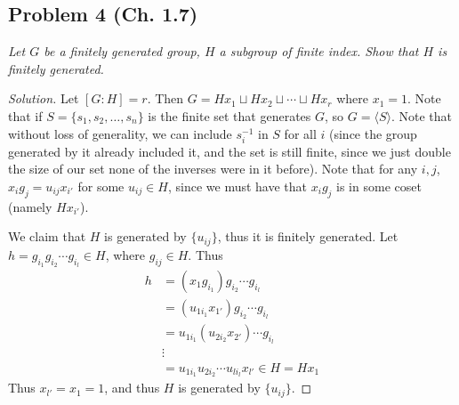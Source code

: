 \documentclass{article}
\begin{document}
\subsection*{Problem 4 (Ch. 1.7)}
{\it Let $G$ be a finitely generated group,
$H$ a subgroup of finite index.
Show that $H$ is finitely generated.}
\begin{proof}[Solution]\let\qed\relax
	Let $[G : H] = r$.
	Then $G = Hx_1 \sqcup Hx_2 \sqcup \cdots \sqcup Hx_r$ where $x_1 = 1$.
	Note that if $S = \{s_1,s_2,\dots,s_n\}$ is the finite set that generates $G$,
	so $G = \langle S \rangle$.
	Note that without loss of generality,
	we can include $s_i^{-1}$ in $S$ for all $i$
	(since the group generated by it already included it,
	and the set is still finite, since we just double
	the size of our set none of the inverses were in it before).
	Note that for any $i,j$, $x_ig_j = u_{ij}x_{i'}$ for some $u_{ij} \in H$,
	since we must have that $x_ig_j$ is in some coset
	(namely $Hx_{i'}$).

	We claim that $H$ is generated by $\{u_{ij}\}$,
	thus it is finitely generated.
	Let $h = g_{i_1}g_{i_2}\cdots g_{i_l} \in H$, where $g_{ij} \in H$.
	Thus
	\begin{align*}
		h &= (x_1g_{i_1})g_{i_2} \cdots g_{i_l}\\
		  &= (u_{1i_1}x_{1'})g_{i_2}\cdots g_{i_l}\\
		  &= u_{1i_1}(u_{2i_2}x_{2'})\cdots g_{i_l}\\
		  &\vdots\\
		  &=u_{1i_1}u_{2i_2} \cdots u_{li_l}x_{l'} \in H = Hx_1
	\end{align*}
	Thus $x_{l'} = x_1 = 1$, and thus $H$ is generated by $\{u_{ij}\}$.
\end{proof}
\end{document}
